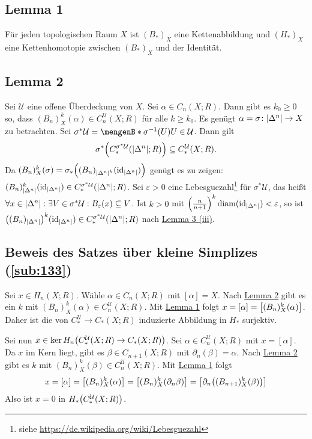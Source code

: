 \subsection{Lemma 1} %
\label{sub:1310}
Für jeden topologischen Raum $X$ ist $(B_*)_X$ eine Kettenabbildung und $(H_*)_X$ eine Kettenhomotopie zwischen $(B_*)_X$ und der Identität.

\subsection{Lemma 2} %
\label{sub:1311}
Sei $\mathcal{U}$ eine offene Überdeckung von $X$. Sei $\alpha\in C_n(X;R)$. Dann gibt es $k_0\ge 0$ so, dass $(B_n)^{k}_X(\alpha)\in C^\mathcal{U}_n(X;R)$ für alle $k\ge k_0$.
Es genügt $\alpha= \sigma \colon \abs*{\Delta^n} \to X$ zu betrachten. Sei $\sigma^* \mathcal{U}= \set[\sigma ^{-1}(U)]{U \in \mathcal{U}}$. Dann gilt
\[
	\sigma^* \enbrace*{C_*^{\sigma^*\mathcal{U}} \enbrace*{\abs*{\Delta^n};R}} \subseteq C_*^\mathcal{U}(X;R). 
\]
Da $(B_n)_X^k(\sigma) = \sigma_* \enbrace*{(B_n)_{\abs*{\Delta^n}^k} (\id_{\abs*{\Delta^n} })}$ genügt es zu zeigen: 
$(B_n)^k_{\abs*{\Delta^n}} (\id_{\abs*{\Delta^n} }) \in C_*^{\sigma^* \mathcal{U}}\enbrace*{\abs*{\Delta^n};R}$. Sei $\varepsilon>0$ eine 
Lebesguezahl\footnote{siehe \url{https://de.wikipedia.org/wiki/Lebesguezahl}} für $\sigma^*\mathcal{U}$, das heißt 
\(
	\forall x \in \abs*{\Delta^n} : \exists V \in \sigma^*\mathcal{U} : B_\varepsilon(x) \subseteq V 
\).
Ist $k>0$ mit $\enbrace*{\frac{n}{n+1}}^k \diam(\id_{\abs*{\Delta^n}})< \varepsilon$, so ist 
$\enbrace*{(B_n)_{\abs*{\Delta^n} }}^k (\id_{\abs*{\Delta^n}}) \in C_*^{\sigma^*\mathcal{U}} \enbrace*{\abs*{\Delta^n};R}$ nach \hyperref[sub:1316]{Lemma 3 (iii)}. \bewende

\subsection{Beweis des Satzes über kleine Simplizes (\ref{sub:133})} %
\label{sub:1312}
Sei $x \in H_n(X;R)$. Wähle $\alpha \in C_n(X;R)$ mit $[\alpha]=X$. Nach \hyperref[sub:1311]{Lemma 2} gibt es ein $k$ mit $(B_n)_X^k(\alpha) \in C_n^\mathcal{U}(X;R)$.
Mit \hyperref[sub:1310]{Lemma 1} folgt $x=[\alpha]= \benbrace*{(B_n)_X^k(\alpha)}$. Daher ist die von $C_*^\mathcal{U} \to C_*(X;R)$ induzierte Abbildung in $H_*$ surjektiv.

Sei nun $x \in \ker H_n \enbrace*{C_*^\mathcal{U}(X;R) \to C_*(X;R)}$. Sei $\alpha \in C_n^\mathcal{U}(X;R)$ mit $x=[\alpha]$. Da $x$ im Kern liegt, gibt es 
$\beta \in C_{n+1}(X;R)$ mit $\partial_n(\beta)=\alpha$. Nach \hyperref[sub:1311]{Lemma 2} gibt es $k$ mit $(B_n)_X^k(\beta) \in C_n^\mathcal{U}(X;R)$. Mit 
\hyperref[sub:1310]{Lemma 1} folgt 
\[
	x = [\alpha] = \benbrace*{(B_n)_X^k(\alpha)} = \benbrace*{(B_n)_X^k(\partial_n \beta)} = \benbrace*{\partial_n \enbrace*{(B_{n+1})_X^k (\beta)} }   
\]
Also ist $x=0$ in $H_* \enbrace*{C_*^\mathcal{U}(X;R)}$. \bewende

